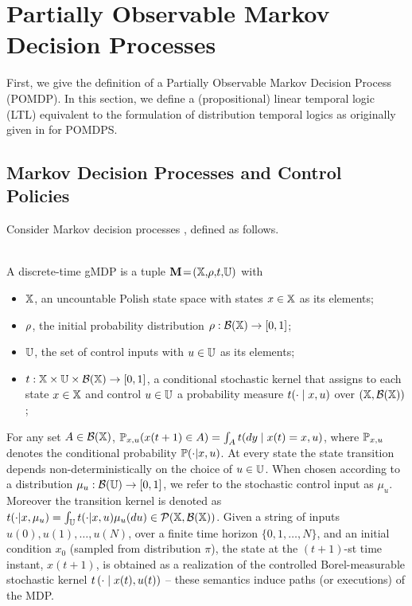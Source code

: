 \documentclass{ifacconf}
\begin{document}
    
 
\section{Partially Observable Markov Decision Processes}

First, we give the definition of a Partially Observable Markov Decision Process (POMDP). In this section, we define a (propositional) linear temporal logic (LTL)  equivalent to the formulation of distribution temporal logics as originally given in \citep{JonesDTL2013} for POMDPS. 




\subsection{Markov Decision Processes and Control Policies}
Consider Markov decision processes \citep{Bertsekas2012,mt1993,hll1996}, defined as follows.%
\begin{definition}\label{def:MDP} \mbox{ }\\
  A discrete-time gMDP is a tuple ${\mathbf{M}}\!=\!({\mathbb{X}},\!\rho,\!t,\!{\mathbb{U}})$ with
  \begin{itemize}
    \item ${\mathbb{X}}$,  an uncountable Polish state space with states $x\in{\mathbb{X}}$ as its elements;
    \item $\rho$, the initial probability distribution $\rho:\mathcal{B}({\mathbb{X}})\rightarrow [0,1]$;
    \item ${\mathbb{U}}$, the set of control inputs with $u\in{\mathbb{U}}$ as its elements;
    \item $t:{\mathbb{X}}\times{\mathbb{U}}\times\mathcal B({\mathbb{X}})\rightarrow[0,1]$, a conditional stochastic kernel that assigns to each state $x\in {\mathbb{X}}$ and control $u\in {\mathbb{U}}$ a probability measure $t(\cdot\mid x,u)$ over $({\mathbb{X}},\mathcal B({\mathbb{X}}))$;
  \end{itemize}
\end{definition}
For any set $A\in \mathcal{B}({\mathbb{X}})$, $\po_{x,u}(x(t+1)\in A)=\int_A \tr(dy\mid x(t)=x,u)$, where $\mathbb{P}_{x,u}$ denotes the conditional probability $\mathbb{P}(\cdot{\mid} x,u)$.
At every state the state transition depends non-deterministically on the choice of $u\in {\mathbb{U}}$.
When chosen according to
a distribution  $\mu_u:\mathcal{B}({\mathbb{U}})\rightarrow [0,1]$, we refer to the stochastic control input as $\mu_u$. Moreover
the transition kernel is denoted as $\tr(\cdot| x, \mu_u)=\int_\U \tr(\cdot| x, u) \mu_u(du)\in \mathcal P(\X,\mathcal B(\X))$.
Given a string of inputs
$u(0), u(1), \ldots, u(N)$,
over a finite time horizon $\{0,1,\ldots, N\}$,
and an initial condition  $x_0$ (sampled from distribution $\pi$),
the state at the $(t+1)$-st time instant, $x(t+1)$,
is obtained as a realization of the controlled Borel-measurable stochastic kernel $t\left(\cdot\mid x(t), u(t) \right)$ --
these semantics induce paths (or executions) of the MDP.
 
\end{document}
